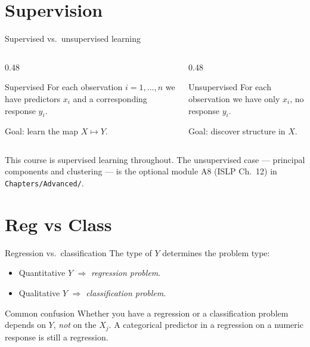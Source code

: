 \documentclass[aspectratio=169,11pt]{beamer}
\begin{document}
\section{Supervision}

\begin{frame}{Supervised vs.\ unsupervised learning}
  \begin{columns}[T]
    \begin{column}{0.48\textwidth}
      \begin{block}{Supervised}
        For each observation $i = 1, \ldots, n$ we have predictors
        $x_i$ and a corresponding response $y_i$.
      \end{block}
      Goal: learn the map $X \mapsto Y$.
    \end{column}
    \begin{column}{0.48\textwidth}
      \begin{block}{Unsupervised}
        For each observation we have only $x_i$, no response $y_i$.
      \end{block}
      Goal: discover structure in $X$.
    \end{column}
  \end{columns}
  \begin{takeaway}
    This course is supervised learning throughout. The unsupervised case
    --- principal components and clustering --- is the optional module A8
    (ISLP Ch.\ 12) in \texttt{Chapters/Advanced/}.
  \end{takeaway}
\end{frame}


\section{Reg vs Class}

\begin{frame}{Regression vs.\ classification}
  The type of $Y$ determines the problem type:
  \begin{readme}
    \begin{itemize}
      \item Quantitative $Y$ $\Rightarrow$ \emph{regression problem}.
      \item Qualitative $Y$ $\Rightarrow$ \emph{classification
            problem}.
    \end{itemize}
  \end{readme}
  \begin{alertblock}{Common confusion}
    Whether you have a regression or a classification problem depends
    on $Y$, \emph{not} on the $X_j$. A categorical predictor in a
    regression on a numeric response is still a regression.
  \end{alertblock}
\end{frame}
\end{document}
